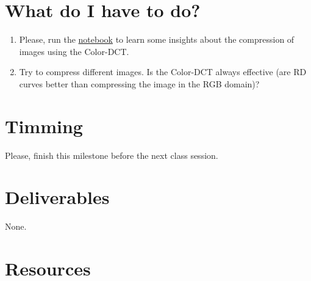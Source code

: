 
\section{What do I have to do?}

\begin{enumerate}
\item Please, run the
  \href{https://github.com/Sistemas-Multimedia/Sistemas-Multimedia.github.io/blob/master/contents/color_DCT/RD_performance.ipynb}{notebook}
  to learn some insights about the compression of images using the
  Color-DCT.
\item Try to compress different images. Is the Color-DCT always
  effective (are RD curves better than compressing the image in
  the RGB domain)?
\end{enumerate}

\section{Timming}

Please, finish this milestone before the next class session.

\section{Deliverables}

None.

\section{Resources}

\renewcommand{\addcontentsline}[3]{}%

